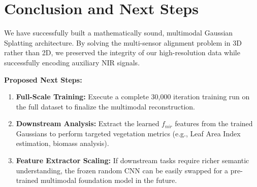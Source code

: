 \documentclass[12pt]{article}
\begin{document}
\section{Conclusion and Next Steps}
We have successfully built a mathematically sound, multimodal Gaussian Splatting architecture. By solving the multi-sensor alignment problem in 3D rather than 2D, we preserved the integrity of our high-resolution data while successfully encoding auxiliary NIR signals.

\textbf{Proposed Next Steps:}
\begin{enumerate}
    \item \textbf{Full-Scale Training:} Execute a complete 30,000 iteration training run on the full dataset to finalize the multimodal reconstruction.
    \item \textbf{Downstream Analysis:} Extract the learned $f_{nir}$ features from the trained Gaussians to perform targeted vegetation metrics (e.g., Leaf Area Index estimation, biomass analysis).
    \item \textbf{Feature Extractor Scaling:} If downstream tasks require richer semantic understanding, the frozen random CNN can be easily swapped for a pre-trained multimodal foundation model in the future.
\end{enumerate}
\end{document}
